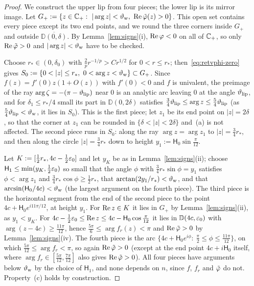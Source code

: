 \begin{proof}
We construct the upper lip from four pieces; the lower lip is its mirror image. Let
$G_+:=\{z\in\C_+:\ |\arg z|<\thw,\ \re\tvphi(z)>0\}$. This open set contains every piece except its two end points, and
we round the three corners inside $G_+$ and outside $\overline{\mathbb D(0,\delta)}$. By Lemma~\ref{lem:signs}(i), $\operatorname{Re}\varphi<0$ on all of
$\mathbb{C}_+$, so only $\operatorname{Re}\tilde\varphi>0$ and $|\arg z|<\vartheta_{\mathrm{w}}$ have to be checked.

Choose $r_*\in(0,\delta_0)$ with $\frac2pr^{-1/p}>Cr^{1/2}$ for $0<r\le r_*$; then~\eqref{eq:retvphi-zero} gives
$S_0:=\{0<|z|\le r_*,\ 0<\arg z<\thw\}\subset G_+$. Since $f(z)=f'(0)z(1+O(z))$ with $f'(0)<0$ and $f$ is univalent,
the preimage of the ray $\arg\zeta=-(\pi-\vartheta_{\mathrm{lip}})$ near $0$ is an analytic arc leaving $0$ at the angle $\vartheta_{\mathrm{lip}}$, and for
$\delta_1\le r_*/4$ small its part in $\mathbb D(0,2\delta)$ satisfies $\frac34\vartheta_{\mathrm{lip}}\le\arg z\le\frac54\vartheta_{\mathrm{lip}}$ (as
$\frac54\vartheta_{\mathrm{lip}}<\vartheta_{\mathrm{w}}$, it lies in $S_0$). This is the first piece; let $z_1$ be its end point on $|z|=2\delta$, so that
the corner at $z_1$ can be rounded in $\{\delta<|z|<2\delta\}$ and~(a) is not affected. The second piece runs in $S_0$:
along the ray $\arg z=\arg z_1$ to $|z|=\frac34r_*$, and then along the circle $|z|=\frac34r_*$ down to height
$y_1:=\mathsf H_0\sin\frac\pi{12}$.

Let $K:=[\frac12r_*,4c-\frac12\varepsilon_0]$ and let $y_K$ be as in Lemma~\ref{lem:signs}(ii); choose
$\mathsf H_1\le\min(y_K,\frac12\varepsilon_0)$ so small that the angle $\phi$ with $\frac34r_*\sin\phi=y_1$ satisfies $\phi<\arg z_1$
and $\frac34r_*\cos\phi\ge\frac12r_*$, that $\arctan(2y_1/r_*)<\vartheta_{\mathrm{w}}$, and that $\arcsin(\mathsf H_0/4c)<\vartheta_{\mathrm{w}}$ (the largest
argument on the fourth piece). The third piece is the horizontal segment from the end of the second piece to the point
$4c+\mathsf H_0e^{i11\pi/12}$, at height $y_1$. For $\operatorname{Re} z\in K$ it lies in $G_+$ by Lemma~\ref{lem:signs}(ii), as $y_1<y_K$.
For $4c-\frac12\varepsilon_0\le\operatorname{Re} z\le4c-\mathsf H_0\cos\frac\pi{12}$ it lies in $\mathbb D(4c,\varepsilon_0)$ with $\arg(z-4c)\ge\frac{11\pi}{12}$,
hence $\frac{5\pi}6\le\arg f_r(z)<\pi$ and $\operatorname{Re}\tilde\varphi>0$ by Lemma~\ref{lem:signs}(iv). The fourth piece is the arc
$\{4c+\mathsf H_0e^{i\phi}:\ \frac\pi2\le\phi\le\frac{11\pi}{12}\}$, on which $\frac{5\pi}{12}\le\arg f_r<\pi$, so again
$\operatorname{Re}\tilde\varphi>0$ (except at the end point $4c+i\mathsf H_0$ itself, where $\arg f_r\in[\frac{5\pi}{12},\frac{7\pi}{12}]$ also
gives $\operatorname{Re}\tilde\varphi>0$). All four pieces have arguments below $\vartheta_{\mathrm{w}}$ by the choice of $\mathsf H_1$, and none depends on $n$, since
$f$, $f_r$ and $\tilde\varphi$ do not. Property~(c) holds by construction.
\end{proof}

